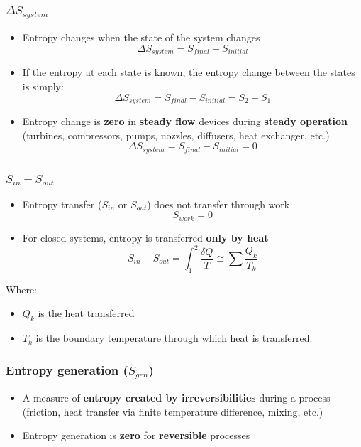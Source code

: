 \documentclass[11pt]{article}
\begin{document}
\subsubsection{\(\Delta S_{system}\)}
\label{sec:org859ccfc}
\begin{itemize}
\item Entropy changes when the state of the system changes
\[\Delta S_{system} = S_{final} - S_{initial}\]
\item If the entropy at each state is known, the entropy change between the states is simply:
\[\Delta S_{system} = S_{final} - S_{initial} = S_2 - S_1\]
\item Entropy change is \textbf{zero} in \textbf{steady flow} devices during \textbf{steady operation} (turbines, compressors, pumps, nozzles, diffusers, heat exchanger, etc.)
\[\Delta S_{system} = S_{final} - S_{initial} = 0\]
\end{itemize}
\subsubsection{\(S_{in} - S_{out}\)}
\label{sec:orgdaa2d1a}
\begin{itemize}
\item Entropy transfer (\(S_{in}\) or \(S_{out}\)) does not transfer through work
\[S_{work} = 0\]
\item For closed systems, entropy is transferred \textbf{only by heat}
\[S_{in} - S_{out} = \int_1^2 \frac{\delta Q}{T} \cong \sum \frac{Q_k}{T_k}\]
\end{itemize}

Where:
\begin{itemize}
\item \(Q_k\) is the heat transferred
\item \(T_k\) is the boundary temperature through which heat is transferred.
\end{itemize}
\subsubsection{Entropy generation (\(S_{gen}\))}
\label{sec:org0dd8453}
\begin{itemize}
\item A measure of \textbf{entropy created by irreversibilities} during a process (friction, heat transfer via finite temperature difference, mixing, etc.)
\item Entropy generation is \textbf{zero} for \textbf{reversible} processes
\end{itemize}
\end{document}
